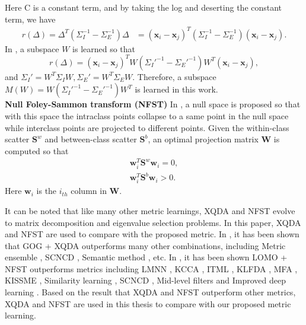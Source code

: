 Here C is a constant term, and by taking the log and deserting the constant term, we have 
\begin{equation}
\begin{aligned}
r(\Delta) = \Delta^T(\Sigma_I^{-1} - \Sigma_E^{-1})\Delta 
	   & = (\bm{x}_i - \bm{x}_j)^T(\Sigma_I^{-1} - \Sigma_E^{-1})(\bm{x}_i - \bm{x}_j).
\end{aligned}
\end{equation}
In \cite{LOMO}, a subspace $W$ is learned so that 
\begin{equation}
r(\Delta) = (\bm{x}_i - \bm{x}_j)^TW({\Sigma_I}'^{-1} - {\Sigma_E}'^{-1})W^T(\bm{x}_i - \bm{x}_j),
\end{equation}
and ${\Sigma_I}' = W^T\Sigma_IW, {\Sigma_E}' = W^T\Sigma_EW$. Therefore, a subspace $M(W) = W({\Sigma_I}'^{-1} - {\Sigma_E}'^{-1})W^T$ is learned in this work.\\
\indent \textbf{Null Foley-Sammon transform (NFST)} In \cite{NFST}, a null space is proposed so that with this space the intraclass points collapse to a same point in the null space while interclass points are projected to different points. Given the within-class scatter $\bm{S}^w$ and between-class scatter $\bm{S}^b$, an optimal projection matrix $\bm{W}$ is computed so that 
\begin{equation}
\begin{aligned}
\bm{w}_i^T\bm{S}^w\bm{w}_i = 0,\\
\bm{w}_i^T\bm{S}^b\bm{w}_i > 0.
\end{aligned}
\end{equation}
Here $\bm{w}_i$ is the $i_{th}$ column in $\bm{W}$.

It can be noted that like many other metric learnings, XQDA and NFST evolve to matrix decomposition and eigenvalue selection problems. In this paper, XQDA and NFST are used to compare with the proposed metric. In \cite{GOG}, it has been shown that GOG + XQDA outperforms many other combinations, including Metric ensemble \cite{MetricEnsembles}, SCNCD \cite{SCNCD}, Semantic method \cite{SemanticMethod}, etc. In \cite{ NFST}, it has been shown LOMO + NFST outperforms metrics including LMNN \cite{LMNN}, KCCA \cite{KCCA}, ITML \cite{ITML}, KLFDA \cite{KLFDA}, MFA \cite{KernelVersionMetrics}, KISSME \cite{KISSME}, Similarity learning \cite{SimilarityLearning}, SCNCD \cite{SCNCD}, Mid-level filters \cite{MidlevelFilters} and Improved deep learning \cite{ImprovedCNN}. Based on the result that XQDA and NFST outperform other metrics, XQDA and NFST are used in this thesis to compare with our proposed metric learning. 

